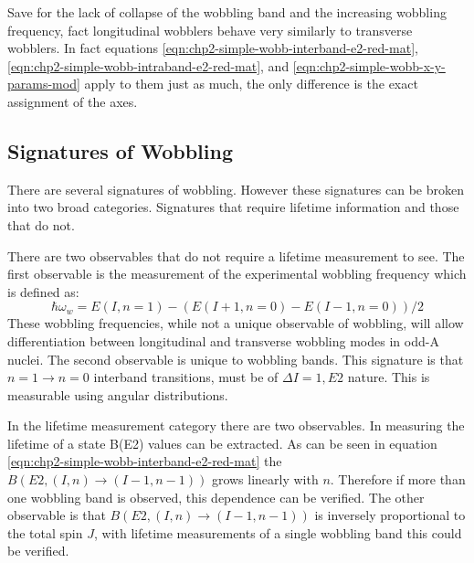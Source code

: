 Save for the lack of collapse of the wobbling band and the increasing wobbling frequency,  fact longitudinal wobblers behave very similarly to transverse wobblers. In fact equations \ref{eqn:chp2-simple-wobb-interband-e2-red-mat}, \ref{eqn:chp2-simple-wobb-intraband-e2-red-mat}, and \ref{eqn:chp2-simple-wobb-x-y-params-mod} apply to them just as much, the only difference is the exact assignment of the axes.

\subsection{Signatures of Wobbling}
\label{ssec:models-wobbling-signatures}
There are several signatures of wobbling. However these signatures can be broken into two broad categories. Signatures that require lifetime information and those that do not.

There are two observables that do not require a lifetime measurement to see. The first observable is the measurement of the experimental wobbling frequency which is defined as:
\begin{equation}
\label{eqn:chp2-exp-wob-frequencies}
\hbar\omega_w = E(I,n=1) - (E(I+1,n=0)-E(I-1,n=0))/2
\end{equation}
 These wobbling frequencies, while not a unique observable of wobbling, will allow differentiation between longitudinal and transverse wobbling modes in odd-A nuclei. The second observable is unique to wobbling bands. This signature is that $n=1 \rightarrow n=0$ interband transitions, must be of $\Delta{}I=1, E2$ nature. This is measurable using angular distributions.
 
In the lifetime measurement category there are two observables. In measuring the lifetime of a state B(E2) values can be extracted. As can be seen in equation \ref{eqn:chp2-simple-wobb-interband-e2-red-mat} the $B(E2,(I,n)\rightarrow(I-1,n-1))$ grows linearly with $n$. Therefore if more than one wobbling band is observed, this dependence can be verified. The other observable is that $B(E2,(I,n)\rightarrow(I-1,n-1))$ is inversely proportional to the total spin $J$, with lifetime measurements of a single wobbling band this could be verified.